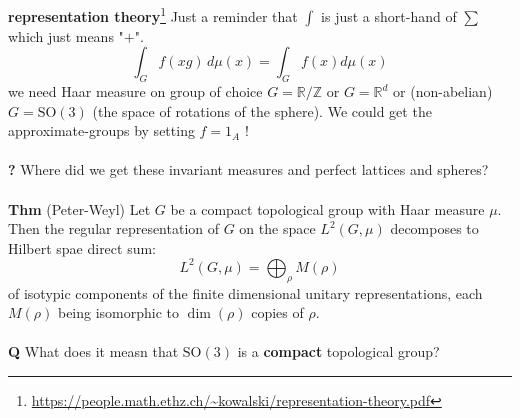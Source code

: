 \documentclass[12pt]{article}
\begin{document}
{\newpage 
\noindent \textbf{representation theory}\footnote{\url{https://people.math.ethz.ch/~kowalski/representation-theory.pdf}} Just a reminder that $\int$ is just a short-hand of $\sum$ which just means "$+$".
$$ \int_G f(xg) \, d\mu(x) = \int_G f(x) d\mu(x) $$
we need Haar measure on group of choice $G = \mathbb{R}/\mathbb{Z}$ or $G = \mathbb{R}^d$ or (non-abelian) $G = \text{SO}(3)$ (the space of rotations of the sphere). We could get the approximate-groups by setting $f = 1_A$ ! \\ \\
\textbf{?} Where did we get these invariant measures and perfect lattices and spheres?   \\ \\
\textbf{Thm} (Peter-Weyl) Let $G$ be a compact topological group with Haar measure $\mu$.  Then the regular representation of $G$ on the space $L^2(G, \mu)$ decomposes to Hilbert spae direct sum:
$$ L^2(G, \mu) = \bigoplus_\rho M(\rho) $$
of isotypic components of the finite dimensional unitary representations, each $M(\rho)$ being isomorphic to $\dim(\rho)$ copies of $\rho$. \\ \\
\textbf{Q} What does it measn that $\text{SO}(3)$ is a \textbf{compact} topological group?

\newpage

}
\end{document}
